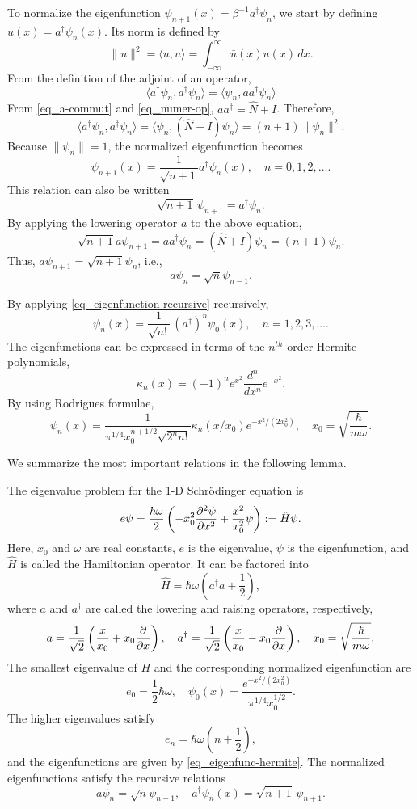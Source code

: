 \documentclass[11pt]{article}
\begin{document}
To normalize the eigenfunction $\psi_{n+1}(x) = \beta^{-1} a^\dag \psi_n$, we start by defining $u(x) =
a^\dag\psi_n(x)$. Its norm is defined by
\[
\| u \|^2 = \langle u, u \rangle = \int_{-\infty}^\infty \bar{u}(x) u(x)\, dx.
\]
From the definition of the adjoint of an operator,
\[
\langle a^\dag\psi_n, a^\dag\psi_n\rangle = \langle \psi_n, a a^\dag \psi_n \rangle
\]
From \eqref{eq_a-commut} and \eqref{eq_numer-op}, $a a^\dag = \hat{N} + I$. Therefore,
\[
\langle a^\dag\psi_n, a^\dag\psi_n\rangle = \langle \psi_n, (\hat{N}+I)\psi_n \rangle = (n+1) \| \psi_n \|^2.
\]
Because $\| \psi_n \|=1$, the normalized eigenfunction becomes
\begin{equation}\label{eq_eigenfunction-recursive}
\psi_{n+1}(x) = \frac{1}{\sqrt{n+1}} a^\dag\psi_n(x),\quad n=0,1,2,\ldots.
\end{equation}
This relation can also be written
\[
\sqrt{n+1}\, \psi_{n+1} = a^\dag \psi_n.
\]
By applying the lowering operator $a$ to the above equation,
\[
\sqrt{n+1} a\psi_{n+1} = a a^\dag \psi_n = (\hat{N}+I) \psi_n = (n+1) \psi_n.
\]
Thus, $a \psi_{n+1} = \sqrt{n+1} \psi_n$, i.e.,
\[
a \psi_n = \sqrt{n} \psi_{n-1}.
\]

By applying \eqref{eq_eigenfunction-recursive} recursively,
\[
\psi_{n}(x) = \frac{1}{\sqrt{n!}}\,
(a^\dag)^n\psi_0(x),\quad n=1,2,3,\ldots. 
\]
The eigenfunctions can be expressed in terms of the $n^{th}$ order Hermite polynomials,
\[
\kappa_n(x) = (-1)^n e^{x^2} \frac{d^n}{dx^n} e^{-x^2}.
\]
By using Rodrigues formulae,
\begin{equation}\label{eq_eigenfunc-hermite}
\psi_n(x) = \frac{1}{\pi^{1/4} x_0^{n+1/2} \sqrt{2^n n!}} \kappa_n(x/x_0) e^{-x^2/(2 x_0^2)},\quad
x_0=\sqrt{\frac{\hbar}{m\omega}}.
\end{equation}

We summarize the most important relations in the following lemma.
\begin{lemma}
  The eigenvalue problem for the 1-D Schr\"odinger equation is
  \[
  e\psi = \frac{\hbar\omega}{2}\left( - x_0^2 \frac{\partial^2\psi}{\partial x^2} + \frac{x^2}{x_0^2}
  \psi\right) := \hat{H}\psi.
  \]
  Here, $x_0$ and $\omega$ are real constants, $e$ is the eigenvalue, $\psi$ is the eigenfunction, and $\hat{H}$
  is called the Hamiltonian operator. It can be factored into
  \[
  \hat{H} = \hbar\omega \left( a^\dag a + \frac{1}{2} \right),
  \]
  where $a$ and $a^\dag$ are called the lowering and raising operators, respectively,
  \[
  a = \frac{1}{\sqrt{2}}\left( \frac{x}{x_0} + x_0 \frac{\partial}{\partial x}\right),\quad
  a^\dag = \frac{1}{\sqrt{2}}\left( \frac{x}{x_0} - x_0 \frac{\partial}{\partial x}\right),\quad
  x_0=\sqrt{\frac{\hbar}{m\omega}}.
  \]
  The smallest eigenvalue of $H$ and the corresponding normalized eigenfunction are
  \[
  e_0 = \frac{1}{2}\hbar\omega,\quad \psi_0(x) = \frac{e^{-x^2/(2 x_0^2)}}{\pi^{1/4} x_0^{1/2}}.
  \]
  The higher eigenvalues satisfy
  \[
  e_n = \hbar\omega\left(n + \frac{1}{2}\right),
  \]
  and the eigenfunctions are given by \eqref{eq_eigenfunc-hermite}. The normalized eigenfunctions
  satisfy the recursive relations
  \[
  a \psi_n = \sqrt{n} \psi_{n-1},\quad a^\dag \psi_n(x) = \sqrt{n+1}\, \psi_{n+1}.
  \]
\end{lemma}
\end{document}
